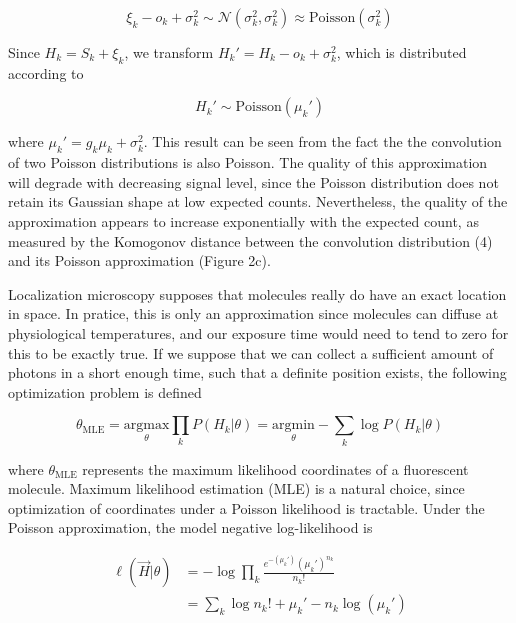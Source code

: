 \documentclass{ucetd}
\begin{document}
\begin{equation*}
\xi_{k} - o_{k} + \sigma_{k}^{2} \sim \mathcal{N}(\sigma_{k}^{2},\sigma_{k}^{2}) \approx \mathrm{Poisson}(\sigma_{k}^{2})
\end{equation*}

Since $H_{k} = S_{k} + \xi_{k}$, we transform $H_{k}' = H_{k} - o_{k} + \sigma_{k}^{2}$, which is distributed according to 

\begin{equation*}
H_{k}' \sim \mathrm{Poisson}(\mu_{k}')
\end{equation*}

where $\mu_{k}' = g_{k}\mu_{k} + \sigma_{k}^{2}$. This result can be seen from the fact the the convolution of two Poisson distributions is also Poisson. The quality of this approximation will degrade with decreasing signal level, since the Poisson distribution does not retain its Gaussian shape at low expected counts. Nevertheless, the quality of the approximation appears to increase exponentially with the expected count, as measured by the Komogonov distance between the convolution distribution (4) and its Poisson approximation (Figure 2c).

Localization microscopy supposes that molecules really do have an exact location in space. In pratice, this is only an approximation since molecules can diffuse at physiological temperatures, and our exposure time would need to tend to zero for this to be exactly true. If we suppose that we can collect a sufficient amount of photons in a short enough time, such that a definite position exists, the following optimization problem is defined

\begin{equation*}
\theta_{\mathrm{MLE}} = \underset{\theta}{\mathrm{argmax}}\prod_{k}P(H_{k}|\theta)= \underset{\theta}{\mathrm{argmin}}-\sum_{k}\log P(H_{k}|\theta)
\end{equation*}


where $\theta_{\mathrm{MLE}}$ represents the maximum likelihood coordinates of a fluorescent molecule. Maximum likelihood estimation (MLE) is a natural choice, since optimization of coordinates under a Poisson likelihood is tractable. Under the Poisson approximation, the model negative log-likelihood is

\begin{align}
\ell(\vec{H}|\theta) &= -\log \prod_{k} \frac{e^{-\left(\mu_{k}'\right)}\left(\mu_{k}'\right)^{n_{k}}}{n_{k}!}\\
&= \sum_{k}  \log n_{k}! + \mu_{k}' - n_{k}\log\left(\mu_{k}'\right)
\end{align}
\end{document}
